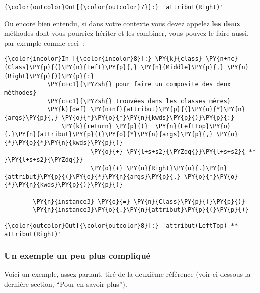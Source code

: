 \begin{Verbatim}[commandchars=\\\{\}]
{\color{outcolor}Out[{\color{outcolor}7}]:} 'attribut(Right)'
\end{Verbatim}
            
    Ou encore bien entendu, si dans votre contexte vous devez appelez
\textbf{les deux} méthodes dont vous pourriez hériter et les combiner,
vous pouvez le faire aussi, par exemple comme ceci~:

    \begin{Verbatim}[commandchars=\\\{\}]
{\color{incolor}In [{\color{incolor}8}]:} \PY{k}{class} \PY{n+nc}{Class}\PY{p}{(}\PY{n}{Left}\PY{p}{,} \PY{n}{Middle}\PY{p}{,} \PY{n}{Right}\PY{p}{)}\PY{p}{:}
            \PY{c+c1}{\PYZsh{} pour faire un composite des deux méthodes}
            \PY{c+c1}{\PYZsh{} trouvées dans les classes mères}
            \PY{k}{def} \PY{n+nf}{attribut}\PY{p}{(}\PY{o}{*}\PY{n}{args}\PY{p}{,} \PY{o}{*}\PY{o}{*}\PY{n}{kwds}\PY{p}{)}\PY{p}{:}
                \PY{k}{return} \PY{p}{(}  \PY{n}{LeftTop}\PY{o}{.}\PY{n}{attribut}\PY{p}{(}\PY{o}{*}\PY{n}{args}\PY{p}{,} \PY{o}{*}\PY{o}{*}\PY{n}{kwds}\PY{p}{)} 
                        \PY{o}{+} \PY{l+s+s2}{\PYZdq{}}\PY{l+s+s2}{ ** }\PY{l+s+s2}{\PYZdq{}} 
                        \PY{o}{+} \PY{n}{Right}\PY{o}{.}\PY{n}{attribut}\PY{p}{(}\PY{o}{*}\PY{n}{args}\PY{p}{,} \PY{o}{*}\PY{o}{*}\PY{n}{kwds}\PY{p}{)}\PY{p}{)}
            
        \PY{n}{instance3} \PY{o}{=} \PY{n}{Class}\PY{p}{(}\PY{p}{)}
        \PY{n}{instance3}\PY{o}{.}\PY{n}{attribut}\PY{p}{(}\PY{p}{)}
\end{Verbatim}


\begin{Verbatim}[commandchars=\\\{\}]
{\color{outcolor}Out[{\color{outcolor}8}]:} 'attribut(LeftTop) ** attribut(Right)'
\end{Verbatim}
            
    \hypertarget{un-exemple-un-peu-plus-compliquuxe9}{%
\subsubsection{Un exemple un peu plus
compliqué}\label{un-exemple-un-peu-plus-compliquuxe9}}

    Voici un exemple, assez parlant, tiré de la deuxième référence (voir
ci-dessous la dernière section, ``Pour en savoir plus'').

